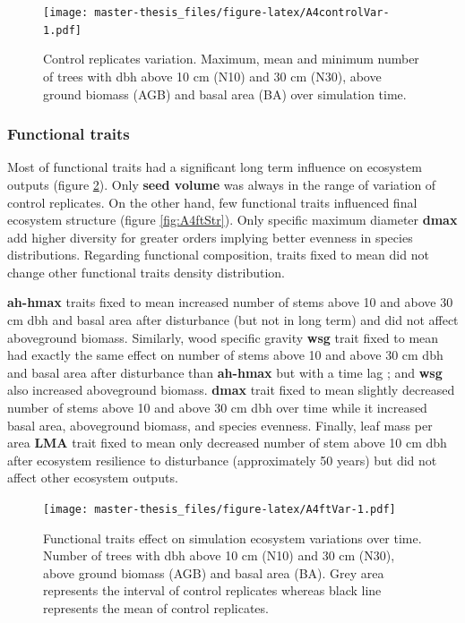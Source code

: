 \documentclass[12pt,]{article}
\theoremstyle{definition}
\theoremstyle{definition}
\theoremstyle{remark}
\begin{document}
\begin{figure}[htbp]
\centering
\texttt{[image: master-thesis\_files/figure-latex/A4controlVar-1.pdf]}
\caption{\label{fig:A4controlVar}Control replicates variation. Maximum, mean
and minimum number of trees with dbh above 10 cm (N10) and 30 cm (N30),
above ground biomass (AGB) and basal area (BA) over simulation time.}
\end{figure}

\subsubsection{Functional traits}\label{functional-traits}

Most of functional traits had a significant long term influence on
ecosystem outputs (figure \ref{fig:A4ftVar}). Only \textbf{seed volume}
was always in the range of variation of control replicates. On the other
hand, few functional traits influenced final ecosystem structure (figure
\ref{fig:A4ftStr}). Only specific maximum diameter \textbf{dmax} add
higher diversity for greater orders implying better evenness in species
distributions. Regarding functional composition, traits fixed to mean
did not change other functional traits density distribution.

\textbf{ah-hmax} traits fixed to mean increased number of stems above 10
and above 30 cm dbh and basal area after disturbance (but not in long
term) and did not affect aboveground biomass. Similarly, wood specific
gravity \textbf{wsg} trait fixed to mean had exactly the same effect on
number of stems above 10 and above 30 cm dbh and basal area after
disturbance than \textbf{ah-hmax} but with a time lag ; and \textbf{wsg}
also increased aboveground biomass. \textbf{dmax} trait fixed to mean
slightly decreased number of stems above 10 and above 30 cm dbh over
time while it increased basal area, aboveground biomass, and species
evenness. Finally, leaf mass per area \textbf{LMA} trait fixed to mean
only decreased number of stem above 10 cm dbh after ecosystem resilience
to disturbance (approximately 50 years) but did not affect other
ecosystem outputs.

\begin{figure}[htbp]
\centering
\texttt{[image: master-thesis\_files/figure-latex/A4ftVar-1.pdf]}
\caption{\label{fig:A4ftVar}Functional traits effect on simulation ecosystem
variations over time. Number of trees with dbh above 10 cm (N10) and 30
cm (N30), above ground biomass (AGB) and basal area (BA). Grey area
represents the interval of control replicates whereas black line
represents the mean of control replicates.}
\end{figure}
\end{document}
